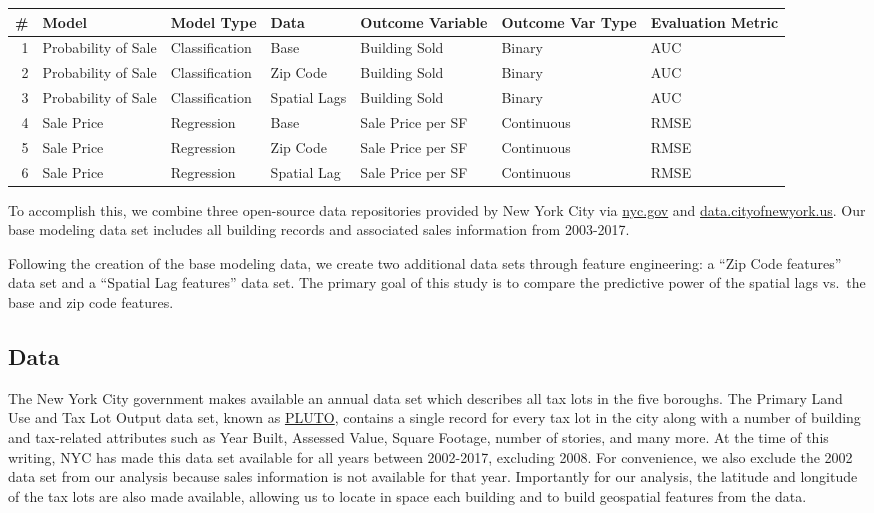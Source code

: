 \documentclass[]{article}
\begin{document}
\begin{longtable}[]{@{}rllllll@{}}
\toprule
\# & Model & Model Type & Data & Outcome Variable & Outcome Var Type &
Evaluation Metric\tabularnewline
\midrule
\endhead
1 & Probability of Sale & Classification & Base & Building Sold & Binary
& AUC\tabularnewline
2 & Probability of Sale & Classification & Zip Code & Building Sold &
Binary & AUC\tabularnewline
3 & Probability of Sale & Classification & Spatial Lags & Building Sold
& Binary & AUC\tabularnewline
4 & Sale Price & Regression & Base & Sale Price per SF & Continuous &
RMSE\tabularnewline
5 & Sale Price & Regression & Zip Code & Sale Price per SF & Continuous
& RMSE\tabularnewline
6 & Sale Price & Regression & Spatial Lag & Sale Price per SF &
Continuous & RMSE\tabularnewline
\bottomrule
\end{longtable}

To accomplish this, we combine three open-source data repositories
provided by New York City via \url{nyc.gov} and
\url{data.cityofnewyork.us}. Our base modeling data set includes all
building records and associated sales information from 2003-2017.

Following the creation of the base modeling data, we create two
additional data sets through feature engineering: a ``Zip Code
features'' data set and a ``Spatial Lag features'' data set. The primary
goal of this study is to compare the predictive power of the spatial
lags vs.~the base and zip code features.

\subsection{Data}\label{data}

The New York City government makes available an annual data set which
describes all tax lots in the five boroughs. The Primary Land Use and
Tax Lot Output data set, known as
\href{https://www1.nyc.gov/site/planning/data-maps/open-data/bytes-archive.page?sorts\%5Byear\%5D=0}{PLUTO},
contains a single record for every tax lot in the city along with a
number of building and tax-related attributes such as Year Built,
Assessed Value, Square Footage, number of stories, and many more. At the
time of this writing, NYC has made this data set available for all years
between 2002-2017, excluding 2008. For convenience, we also exclude the
2002 data set from our analysis because sales information is not
available for that year. Importantly for our analysis, the latitude and
longitude of the tax lots are also made available, allowing us to locate
in space each building and to build geospatial features from the data.
\end{document}
